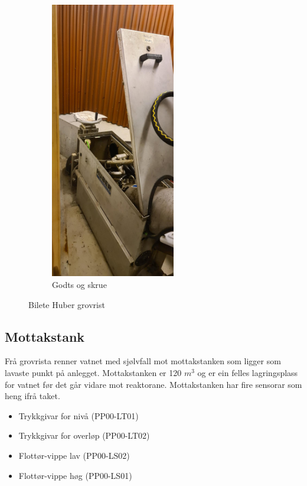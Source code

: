 \begin{figure}[htbp]
\begin{subfigure}[b]{0.3\textwidth}
        \includegraphics[angle=-90,width=0.6\textwidth]{Bilder/Huber2.JPG}
        \caption{Godts og skrue}\label{fig:subfig2}
    \end{subfigure}
    \caption{Bilete Huber grovrist}\label{fig:Illustrasjon-Diffuser}
\end{figure}

\newpage
\subsection{Mottakstank}
Frå grovrista renner vatnet med sjølvfall mot mottakstanken som ligger som lavaste punkt på anlegget.
Mottakstanken er 120 $m^3$ og er ein felles lagringsplass for vatnet før det går vidare mot reaktorane.
Mottakstanken har fire sensorar som heng ifrå taket.

\begin{itemize}
    \item Trykkgivar for nivå (PP00-LT01)
    \item Trykkgivar for overløp (PP00-LT02)
    \item Flottør-vippe lav (PP00-LS02)
    \item Flottør-vippe høg (PP00-LS01)  
\end{itemize}

